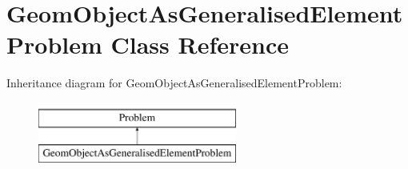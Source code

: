 \hypertarget{classGeomObjectAsGeneralisedElementProblem}{}\section{Geom\+Object\+As\+Generalised\+Element\+Problem Class Reference}
\label{classGeomObjectAsGeneralisedElementProblem}
Inheritance diagram for Geom\+Object\+As\+Generalised\+Element\+Problem\+:\begin{figure}[H]
\begin{center}
\leavevmode
\includegraphics[height=2.000000cm]{classGeomObjectAsGeneralisedElementProblem}
\end{center}
\end{figure}
